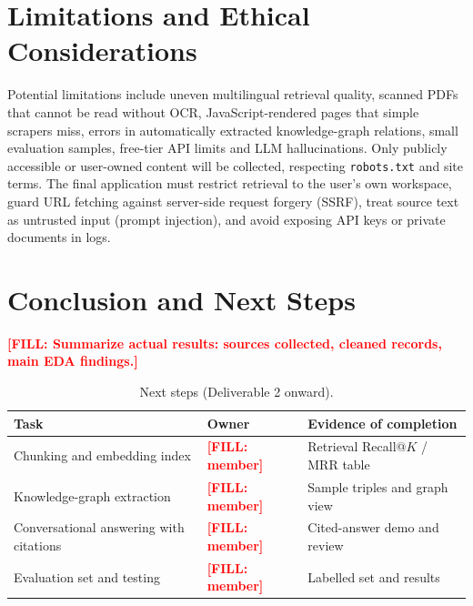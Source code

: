 \documentclass[11pt,a4paper]{article}
\newcommand{\todo}[1]{\textcolor{red}{\textbf{[FILL: #1]}}}
\begin{document}
\section{Limitations and Ethical Considerations}
Potential limitations include uneven multilingual retrieval quality, scanned PDFs that cannot be read without OCR, JavaScript-rendered pages that simple scrapers miss, errors in automatically extracted knowledge-graph relations, small evaluation samples, free-tier API limits and LLM hallucinations. Only publicly accessible or user-owned content will be collected, respecting \texttt{robots.txt} and site terms. The final application must restrict retrieval to the user's own workspace, guard URL fetching against server-side request forgery (SSRF), treat source text as untrusted input (prompt injection), and avoid exposing API keys or private documents in logs.

\section{Conclusion and Next Steps}
\todo{Summarize actual results: sources collected, cleaned records, main EDA findings.}

\begin{table}[H]
\centering
\caption{Next steps (Deliverable 2 onward).}
\begin{tabular}{p{6.2cm}p{3.6cm}p{4.5cm}}
\toprule
\textbf{Task} & \textbf{Owner} & \textbf{Evidence of completion} \\
\midrule
Chunking and embedding index & \todo{member} & Retrieval Recall@$K$ / MRR table \\
Knowledge-graph extraction & \todo{member} & Sample triples and graph view \\
Conversational answering with citations & \todo{member} & Cited-answer demo and review \\
Evaluation set and testing & \todo{member} & Labelled set and results \\
\bottomrule
\end{tabular}
\end{table}

\end{document}
